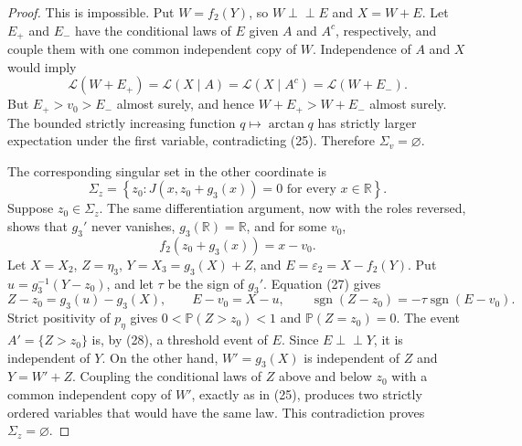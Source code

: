 \documentclass{article}
\begin{document}
\begin{proof}
This is impossible.  Put \(W=f_2(Y)\), so \(W\perp\!\!\!\perp E\) and \(X=W+E\).  Let \(E_+\) and \(E_-\) have the conditional laws of \(E\) given \(A\) and \(A^c\), respectively, and couple them with one common independent copy of \(W\).  Independence of \(A\) and \(X\) would imply
\[
 \mathcal L(W+E_+)=\mathcal L(X\mid A)
 =\mathcal L(X\mid A^c)=\mathcal L(W+E_-).
\tag{25}
\]
But \(E_+>v_0>E_-\) almost surely, and hence \(W+E_+>W+E_-\) almost surely.  The bounded strictly increasing function \(q\mapsto\arctan q\) has strictly larger expectation under the first variable, contradicting (25).  Therefore \(\Sigma_v=\varnothing\).

The corresponding singular set in the other coordinate is
\[
 \Sigma_z=\left\{z_0:J(x,z_0+g_3(x))=0\text{ for every }x\in\mathbb R\right\}.
\tag{26}
\]
Suppose \(z_0\in\Sigma_z\).  The same differentiation argument, now with the roles reversed, shows that \(g_3'\) never vanishes, \(g_3(\mathbb R)=\mathbb R\), and for some \(v_0\),
\[
 f_2(z_0+g_3(x))=x-v_0.
\tag{27}
\]
Let \(X=X_2\), \(Z=\eta_3\), \(Y=X_3=g_3(X)+Z\), and \(E=\varepsilon_2=X-f_2(Y)\).  Put \(u=g_3^{-1}(Y-z_0)\), and let \(\tau\) be the sign of \(g_3'\).  Equation (27) gives
\[
 Z-z_0=g_3(u)-g_3(X),
 \qquad E-v_0=X-u,
 \qquad \operatorname{sgn}(Z-z_0)=-\tau\operatorname{sgn}(E-v_0).
\tag{28}
\]
Strict positivity of \(p_\eta\) gives \(0<\mathbb P(Z>z_0)<1\) and \(\mathbb P(Z=z_0)=0\).  The event \(A' =\{Z>z_0\}\) is, by (28), a threshold event of \(E\).  Since \(E\perp\!\!\!\perp Y\), it is independent of \(Y\).  On the other hand, \(W'=g_3(X)\) is independent of \(Z\) and \(Y=W'+Z\).  Coupling the conditional laws of \(Z\) above and below \(z_0\) with a common independent copy of \(W'\), exactly as in (25), produces two strictly ordered variables that would have the same law.  This contradiction proves \(\Sigma_z=\varnothing\).


\end{proof}
\end{document}
